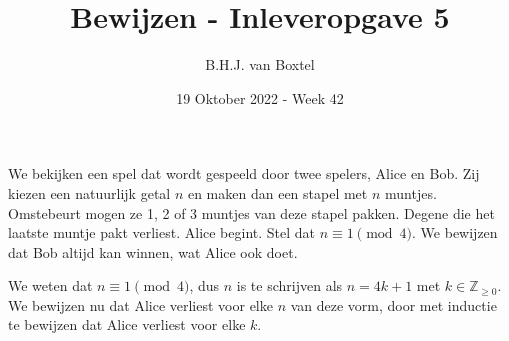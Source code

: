 \documentclass[12pt, dutch, a4paper]{article}
\theoremstyle{definition}
\begin{document}
\title{Bewijzen - Inleveropgave 5}
\author{B.H.J. van Boxtel}
\date{19 Oktober 2022 - Week 42} 

\maketitle
{} 

We bekijken een spel dat wordt gespeeld door twee spelers, Alice en Bob. 
Zij kiezen een natuurlijk getal $n$ en maken dan een stapel met $n$ muntjes. 
Omstebeurt mogen ze 1, 2 of 3 muntjes van deze stapel pakken. 
Degene die het laatste muntje pakt verliest. Alice begint. 
Stel dat $n \equiv 1 \pmod{4}$. We bewijzen dat Bob altijd kan winnen, wat Alice ook doet.

We weten dat $n \equiv 1 \pmod{4}$, 
dus $n$ is te schrijven als $n = 4k + 1$ met $k \in \mathbb{Z}_{\geq 0}$.  
We bewijzen nu dat Alice verliest voor elke $n$ van deze vorm,
door met inductie te bewijzen dat Alice verliest voor elke $k$.  
\end{document}
